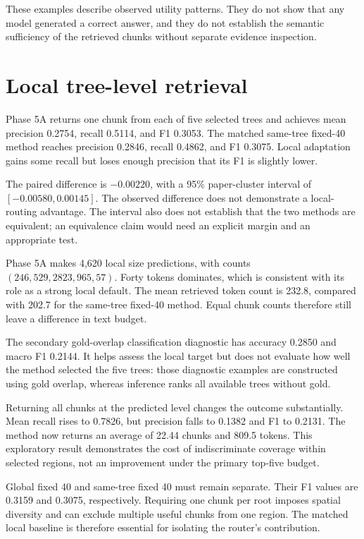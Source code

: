 These examples describe observed utility patterns. They do not
show that any model generated a correct answer, and they do not
establish the semantic sufficiency of the retrieved chunks without
separate evidence inspection.

\section{Local tree-level retrieval}


Phase 5A returns one chunk from each of five selected trees and
achieves mean precision 0.2754, recall 0.5114, and F1 0.3053.
The matched same-tree fixed-40 method reaches precision 0.2846,
recall 0.4862, and F1 0.3075. Local adaptation gains some recall
but loses enough precision that its F1 is slightly lower.

The paired difference is $-0.00220$, with a 95\% paper-cluster
interval of $[-0.00580,0.00145]$. The observed difference does
not demonstrate a local-routing advantage. The interval also does
not establish that the two methods are equivalent; an equivalence
claim would need an explicit margin and an appropriate test.

Phase 5A makes 4,620 local size predictions, with counts
$(246,529,2823,965,57)$. Forty tokens dominates, which is consistent
with its role as a strong local default. The mean retrieved token
count is 232.8, compared with 202.7 for the same-tree fixed-40
method. Equal chunk counts therefore still leave a difference
in text budget.

The secondary gold-overlap classification diagnostic has accuracy
0.2850 and macro F1 0.2144. It helps assess the local target but
does not evaluate how well the method selected the five trees:
those diagnostic examples are constructed using gold overlap,
whereas inference ranks all available trees without gold.

Returning all chunks at the predicted level changes the outcome
substantially. Mean recall rises to 0.7826, but precision falls to
0.1382 and F1 to 0.2131. The method now returns an average of
22.44 chunks and 809.5 tokens. This exploratory result demonstrates
the cost of indiscriminate coverage within selected regions, not
an improvement under the primary top-five budget.

Global fixed 40 and same-tree fixed 40 must remain separate.
Their F1 values are 0.3159 and 0.3075, respectively. Requiring
one chunk per root imposes spatial diversity and can exclude
multiple useful chunks from one region. The matched local baseline
is therefore essential for isolating the router's contribution.

